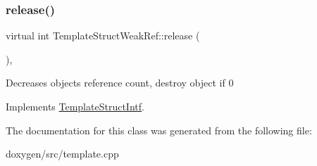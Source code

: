 \mbox{\label{class_template_struct_weak_ref_a70d7485ae68266ce08e5a24058a30fe8}} 
\subsubsection{\texorpdfstring{release()}{release()}}
{\footnotesize\ttfamily virtual int Template\+Struct\+Weak\+Ref\+::release (\begin{DoxyParamCaption}{ }\end{DoxyParamCaption})\hspace{0.3cm}{\ttfamily [inline]}, {\ttfamily [virtual]}}

Decreases object\textquotesingle{}s reference count, destroy object if 0 

Implements \mbox{\hyperlink{class_template_struct_intf_a3dce7dd29d3f66a8080b40578e8a5045}{Template\+Struct\+Intf}}.



The documentation for this class was generated from the following file\+:\begin{DoxyCompactItemize}
\item 
doxygen/src/template.\+cpp\end{DoxyCompactItemize}
